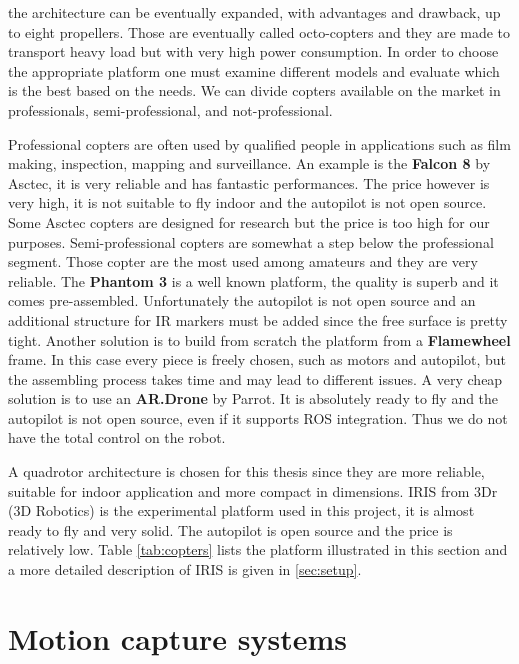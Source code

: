 the architecture can be eventually expanded, with advantages and drawback, up to eight propellers. Those are eventually called octo-copters and they are made to transport heavy load but with very high power consumption. In order to choose the appropriate platform one must examine different models and evaluate which is the best based on the needs. We can divide copters available on the market in professionals, semi-professional, and not-professional.\par Professional copters are often used by qualified people in applications such as film making, inspection, mapping and surveillance. An example is the\textbf{ Falcon 8} by Asctec, it is very reliable and has fantastic performances. The price however is very high, it is not suitable to fly indoor and the autopilot is not open source. Some Asctec copters are designed for research but the price is too high for our purposes. Semi-professional copters are somewhat a step below the professional segment. Those copter are the most used among amateurs and they are very reliable. The \textbf{Phantom 3} is a well known platform, the quality is superb and it comes pre-assembled. Unfortunately the autopilot is not open source and an additional structure for IR markers must be added since the free surface is pretty tight. Another solution is to build from scratch the platform from a \textbf{Flamewheel} frame. In this case every piece is freely chosen, such as motors and autopilot, but the assembling process takes time and may lead to different issues. A very cheap solution is to use an \textbf{AR.Drone} by Parrot. It is absolutely ready to fly and the autopilot is not open source, even if it supports ROS integration. Thus we do not have the total control on the robot.
\par A quadrotor architecture is chosen for this thesis since they are more reliable, suitable for indoor application and more compact in  dimensions. IRIS from 3Dr (3D Robotics) is the experimental platform used in this project, it is almost ready to fly and very solid. The autopilot is open source and the price is relatively low. Table \ref{tab:copters} lists the platform illustrated in this section and a more detailed description of IRIS is given in \ref{sec:setup}.

\section{Motion capture systems}

